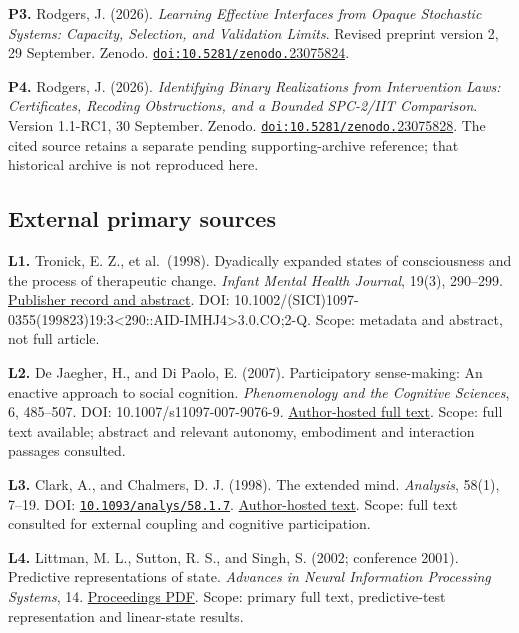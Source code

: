 \documentclass[
  11pt,
  a4paper,
]{article}
\begin{document}
\textbf{P3.} Rodgers, J. (2026). \emph{Learning Effective Interfaces
from Opaque Stochastic Systems: Capacity, Selection, and Validation
Limits}. Revised preprint version 2, 29 September. Zenodo.
\href{https://doi.org/10.5281/zenodo.23075824}{\nolinkurl{doi:10.5281/zenodo.}\mbox{23075824}}.

\textbf{P4.} Rodgers, J. (2026). \emph{Identifying Binary Realizations
from Intervention Laws: Certificates, Recoding Obstructions, and a
Bounded SPC-2/IIT Comparison}. Version 1.1-RC1, 30 September. Zenodo.
\href{https://doi.org/10.5281/zenodo.23075828}{\nolinkurl{doi:10.5281/zenodo.}\mbox{23075828}}.
The cited source retains a separate pending supporting-archive
reference; that historical archive is not reproduced here.

\subsection{External primary sources}\label{external-primary-sources}

\textbf{L1.} Tronick, E. Z., et al.~(1998). Dyadically expanded states
of consciousness and the process of therapeutic change. \emph{Infant
Mental Health Journal}, 19(3), 290--299.
\href{https://onlinelibrary.wiley.com/doi/abs/10.1002/(SICI)1097-0355(199823)19:3\%3C290::AID-IMHJ4\%3E3.0.CO;2-Q}{Publisher
record and abstract}. DOI:
10.1002/(SICI)1097-0355(199823)19:3\textless290::AID-IMHJ4\textgreater3.0.CO;2-Q.
Scope: metadata and abstract, not full article.

\textbf{L2.} De Jaegher, H., and Di Paolo, E. (2007). Participatory
sense-making: An enactive approach to social cognition.
\emph{Phenomenology and the Cognitive Sciences}, 6, 485--507. DOI:
10.1007/s11097-007-9076-9.
\href{https://hannedejaegher.net/wp-content/uploads/2009/11/dejaegherdipaolo07participatorysensemaking.pdf}{Author-hosted
full text}. Scope: full text available; abstract and relevant autonomy,
embodiment and interaction passages consulted.

\textbf{L3.} Clark, A., and Chalmers, D. J. (1998). The extended mind.
\emph{Analysis}, 58(1), 7--19. DOI:
\href{https://doi.org/10.1093/analys/58.1.7}{\nolinkurl{10.1093/analys/58.1.7}}.
\href{https://www.consc.net/papers/extended.html}{Author-hosted text}.
Scope: full text consulted for external coupling and cognitive
participation.

\textbf{L4.} Littman, M. L., Sutton, R. S., and Singh, S. (2002;
conference 2001). Predictive representations of state. \emph{Advances in
Neural Information Processing Systems}, 14.
\href{https://proceedings.neurips.cc/paper/2001/file/1e4d36177d71bbb3558e43af9577d70e-Paper.pdf}{Proceedings
PDF}. Scope: primary full text, predictive-test representation and
linear-state results.
\end{document}
